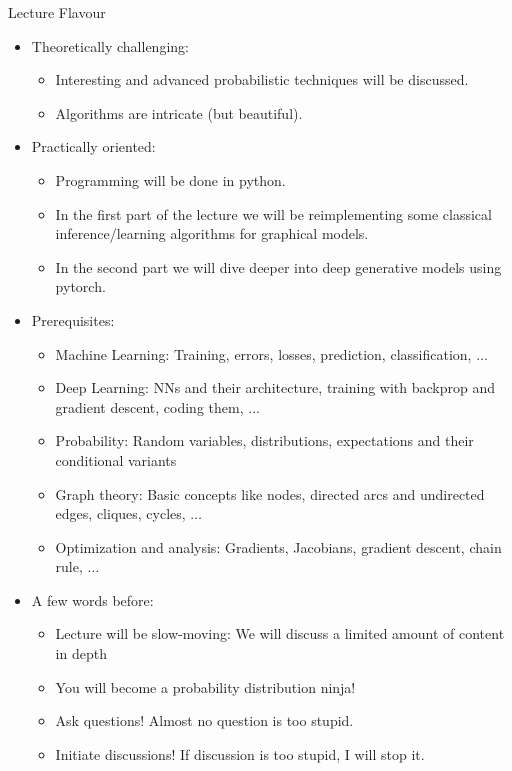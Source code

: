 \begin{frame}{Lecture Flavour}
    \begin{itemize}
    \item Theoretically challenging: 
    \begin{itemize}
        \item Interesting and advanced probabilistic techniques will be discussed.
        \pause \item Algorithms are intricate (but beautiful).
    \end{itemize}
    \pause \item Practically oriented:
    \begin{itemize}
        \item Programming will be done in python.
    \pause \item In the first part of the lecture we will be reimplementing some classical inference/learning algorithms for graphical models.
    \pause \item In the second part we will dive deeper into deep generative models using pytorch.
    \end{itemize}
    \pause \item Prerequisites:
    \begin{itemize}
    \item Machine Learning: Training, errors, losses, prediction, classification, $\ldots$
    \pause \item Deep Learning: NNs and their architecture, training with backprop and gradient descent, coding them, $\ldots$
    \pause \item Probability: Random variables, distributions, expectations and their conditional variants
    \pause \item Graph theory: Basic concepts like nodes, directed arcs and undirected edges, cliques, cycles, $\ldots$
    \pause \item Optimization and analysis: Gradients, Jacobians, gradient descent, chain rule, $\ldots$
    \end{itemize}
    \pause \item A few words before:
    \begin{itemize}
        \pause \item Lecture will be slow-moving: We will discuss a limited amount of content in depth
    \pause \item You will become a probability distribution ninja!
    \pause \item Ask questions! Almost no question is too stupid.
    \pause \item Initiate discussions! If discussion is too stupid, I will stop it.

\end{itemize}
\end{itemize}
\end{frame}
